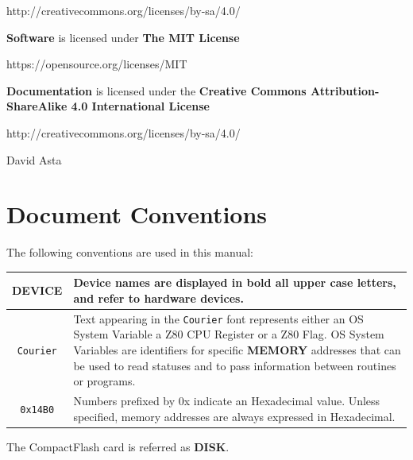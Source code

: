 \documentclass[a4paper,11pt]{article}
\begin{document}
    \hspace{1cm}http://creativecommons.org/licenses/by-sa/4.0/
    
    \textbf{Software} is licensed under \textbf{The MIT License}
    
    \hspace{1cm}https://opensource.org/licenses/MIT
    
    \textbf{Documentation} is licensed under the \textbf{Creative Commons
    Attribution-ShareAlike 4.0 International License}
    
    \hspace{1cm}http://creativecommons.org/licenses/by-sa/4.0/

    \normalsize

    \hrulefill

     David Asta

    \pagebreak
    \section*{Document Conventions}
    The following conventions are used in this manual:

    \begin{center}
        \begin{tabular}{c m{9cm}}
            \hline
            \textbf{DEVICE} & Device names are displayed in bold all upper case 
            letters, and refer to hardware devices.\\
            \hline
            \texttt{Courier} & Text appearing in the \texttt{Courier} font 
            represents either an OS System Variable a Z80 CPU Register
            or a Z80 Flag. OS System Variables are identifiers for specific
            \textbf{MEMORY} addresses that can be used to read statuses and to
            pass information between routines or programs.\\
            \hline
            \texttt{0x14B0} & Numbers prefixed by 0x indicate an Hexadecimal value.
            Unless specified, memory addresses are always expressed in
            Hexadecimal.\\
            \hline
        \end{tabular}
    \end{center}

    The CompactFlash card is referred as \textbf{DISK}.
\end{document}
